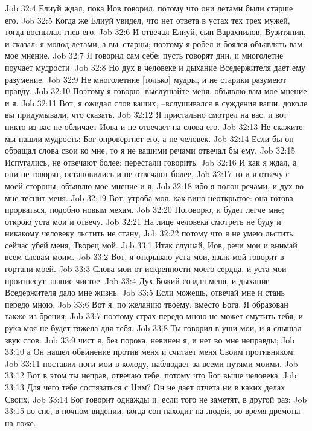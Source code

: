 Job 32:4  Елиуй ждал, пока Иов говорил, потому что они летами были старше его.
Job 32:5  Когда же Елиуй увидел, что нет ответа в устах тех трех мужей, тогда воспылал гнев его.
Job 32:6  И отвечал Елиуй, сын Варахиилов, Вузитянин, и сказал: я молод летами, а вы--старцы; поэтому я робел и боялся объявлять вам мое мнение.
Job 32:7  Я говорил сам себе: пусть говорят дни, и многолетие поучает мудрости.
Job 32:8  Но дух в человеке и дыхание Вседержителя дает ему разумение.
Job 32:9  Не многолетние [только] мудры, и не старики разумеют правду.
Job 32:10  Поэтому я говорю: выслушайте меня, объявлю вам мое мнение и я.
Job 32:11  Вот, я ожидал слов ваших, --вслушивался в суждения ваши, доколе вы придумывали, что сказать.
Job 32:12  Я пристально смотрел на вас, и вот никто из вас не обличает Иова и не отвечает на слова его.
Job 32:13  Не скажите: мы нашли мудрость: Бог опровергнет его, а не человек.
Job 32:14  Если бы он обращал слова свои ко мне, то я не вашими речами отвечал бы ему.
Job 32:15  Испугались, не отвечают более; перестали говорить.
Job 32:16  И как я ждал, а они не говорят, остановились и не отвечают более,
Job 32:17  то и я отвечу с моей стороны, объявлю мое мнение и я,
Job 32:18  ибо я полон речами, и дух во мне теснит меня.
Job 32:19  Вот, утроба моя, как вино неоткрытое: она готова прорваться, подобно новым мехам.
Job 32:20  Поговорю, и будет легче мне; открою уста мои и отвечу.
Job 32:21  На лице человека смотреть не буду и никакому человеку льстить не стану,
Job 32:22  потому что я не умею льстить: сейчас убей меня, Творец мой.
Job 33:1  Итак слушай, Иов, речи мои и внимай всем словам моим.
Job 33:2  Вот, я открываю уста мои, язык мой говорит в гортани моей.
Job 33:3  Слова мои от искренности моего сердца, и уста мои произнесут знание чистое.
Job 33:4  Дух Божий создал меня, и дыхание Вседержителя дало мне жизнь.
Job 33:5  Если можешь, отвечай мне и стань передо мною.
Job 33:6  Вот я, по желанию твоему, вместо Бога. Я образован также из брения;
Job 33:7  поэтому страх передо мною не может смутить тебя, и рука моя не будет тяжела для тебя.
Job 33:8  Ты говорил в уши мои, и я слышал звук слов:
Job 33:9  чист я, без порока, невинен я, и нет во мне неправды;
Job 33:10  а Он нашел обвинение против меня и считает меня Своим противником;
Job 33:11  поставил ноги мои в колоду, наблюдает за всеми путями моими.
Job 33:12  Вот в этом ты неправ, отвечаю тебе, потому что Бог выше человека.
Job 33:13  Для чего тебе состязаться с Ним? Он не дает отчета ни в каких делах Своих.
Job 33:14  Бог говорит однажды и, если того не заметят, в другой раз:
Job 33:15  во сне, в ночном видении, когда сон находит на людей, во время дремоты на ложе.
